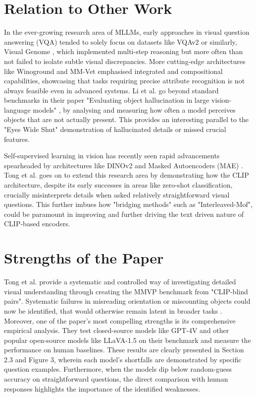 \documentclass[11pt]{article}
\begin{document}
\section*{Relation to Other Work}
 
In the ever-growing research area of MLLMs, early approaches in visual question answering (VQA) tended to solely focus on datasets like VQAv2 \cite{Goyal2017CVPR} or similarly, Visual Genome \cite{Krishna2017IJCV_VisualGenome}, which implemented multi-step reasoning but more often than not failed to isolate subtle visual discrepancies.
More cutting-edge architectures like Winoground \cite{Thrush2022CVPR_Winoground} and MM-Vet \cite{Yu2023Arxiv_MMVet} emphasised integrated and compositional capabilities, showcasing that tasks requiring precise attribute recognition is not always feasible even in advanced systems.
Li et al. go beyond standard benchmarks in their paper "Evaluating object hallucination in large vision-language models" \cite{Li2023Arxiv_POPE}, by analysing and measuring how often a model perceives objects that are not actually present. This provides an interesting parallel to the "Eyes Wide Shut" demonstration of hallucinated details or missed crucial features.


Self-supervised learning in vision has recently seen rapid advancements spearheaded by architectures like DINOv2 and Masked Autoencoders (MAE) \cite{He2022CVPR_MAE}.
Tong et al. goes on to extend this research area by demonstrating how the CLIP architecture, despite its early successes in areas like zero-shot classification, crucially misinterprets details when asked relatively straightforward visual questions.
This further imbues how "bridging methods" such as "Interleaved-Mof", could be paramount in improving and further driving the text driven nature of CLIP-based encoders.

\section*{Strengths of the Paper}

Tong et al. provide a systematic and controlled way of investigating detailed visual understanding through creating the MMVP benchmark from "CLIP-blind pairs". Systematic failures in misreading orientation or miscounting objects could now be identified, that would otherwise remain latent in broader tasks \cite{Tong2024CVPR}.
Moreover, one of the paper's  most compelling strengths is its comprehensive empirical analysis. They test closed-source models like GPT-4V and other popular open-source models like LLaVA-1.5 on their benchmark and measure the performance on human baselines. These results are clearly presented in Section 2.3 and Figure 3, wherein each model's shortfalls are demonstrated by specific question examples.
Furthermore, when the models dip below random-guess accuracy on straightforward questions, the direct comparison with human responses highlights the importance of the identified weaknesses.
\end{document}

